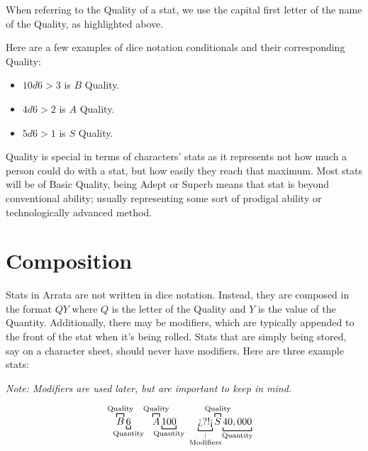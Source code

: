 \documentclass[../main.tex]{subfiles}
\begin{document}
    When referring to the Quality of a stat, we use the capital first letter of the name of the Quality, as highlighted above.

    Here are a few examples of dice notation conditionals and their corresponding Quality:

    \begin{itemize}
        \item $10d6>3$ is $B$ Quality.
        \item $4d6>2$ is $A$ Quality.
        \item $5d6>1$ is $S$ Quality.
    \end{itemize}

    Quality is special in terms of characters' stats as it represents not how much a person could do with a stat, but how easily they reach that maximum. Most stats will be of Basic Quality, being Adept or Superb means that stat is beyond conventional ability; usually representing some sort of prodigal ability or technologically advanced method.

    \section{Composition}

    Stats in Arrata are not written in dice notation. Instead, they are composed in the format $QY$ where $Q$ is the letter of the Quality and $Y$ is the value of the Quantity. Additionally, there may be modifiers, which are typically appended to the front of the stat when it's being rolled. Stats that are simply being stored, say on a character sheet, should never have modifiers. Here are three example stats:

    \emph{Note: Modifiers are used later, but are important to keep in mind.}
    \begin{mdframed}[style=Arrata]
        \begin{equation*}
            \overbracket [0.75pt]{B}^{\mathclap{\text{Quality}}}
            \underbracket[0.75pt]{6}_{\mathclap{\text{Quantity}}} \quad \quad
            \overbracket [0.75pt]{A}^{\mathclap{\text{Quality}}}
            \underbracket[0.75pt]{100}_{\mathclap{\text{Quantity}}} \quad \quad
            \underbracket[0.75pt]{\text{?`?!!`}}_{\mathclap{\stackrel{\vert}{\text{Modifiers}}}}
            \overbracket [0.75pt]{S}^{\mathclap{\text{Quality}}}
            \underbracket[0.75pt]{40,000}_{\mathclap{\text{Quantity}}}
        \end{equation*}
    \end{mdframed}
\end{document}

